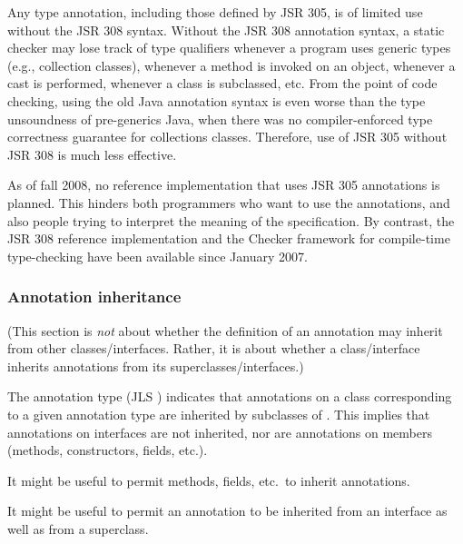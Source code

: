 \documentclass[10pt]{article}
\begin{document}
Any type annotation, including those defined by JSR 305, is of limited use
without the JSR 308 syntax.  Without the JSR 308 annotation syntax, a
static checker may lose track of type qualifiers whenever a program uses
generic types (e.g., collection classes), whenever a method is invoked on
an object, whenever a cast is performed, whenever a class is subclassed,
etc.  From the point of code checking, using the old Java annotation syntax
is even worse than the type unsoundness of pre-generics Java, when there
was no compiler-enforced type correctness guarantee for collections
classes.  Therefore, use of JSR 305 without JSR 308 is much less effective.

As of fall 2008, no reference implementation that uses JSR 305 annotations
is planned.  This hinders both programmers who want to use the annotations,
and also people trying to interpret the meaning of the specification.  By
contrast, the JSR 308 reference implementation and the Checker framework
for compile-time type-checking have been available since January 2007.




\subsubsection{Annotation inheritance\label{annotation-inheritance}}

(This section is \emph{not} about whether the definition of an annotation
may inherit from other classes/interfaces.  Rather, it is about whether a
class/interface inherits annotations from its superclasses/interfaces.)

The annotation type
(JLS )
indicates that annotations on a class  corresponding to a given
annotation type are inherited by subclasses of \@.  This implies
that annotations on interfaces are not inherited, nor are annotations on
members (methods, constructors, fields, etc.).

It might be useful to permit methods, fields, etc.\ to inherit annotations.

It might be useful to permit an annotation to be inherited from an
interface as well as from a superclass.
\end{document}
